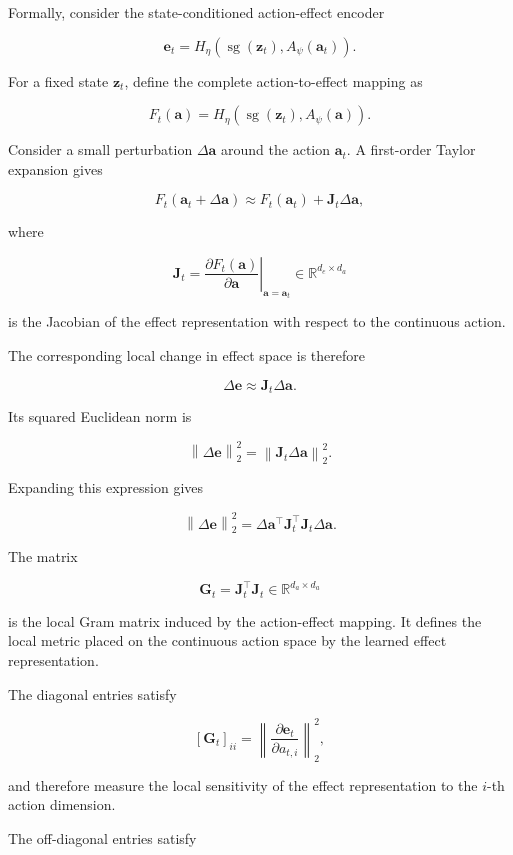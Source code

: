 ﻿\documentclass{article}
\begin{document}
Formally, consider the state-conditioned action-effect encoder

\[
\mathbf{e}_t
=
H_{\eta}
\left(
\operatorname{sg}(\mathbf{z}_t),
A_{\psi}(\mathbf{a}_t)
\right).
\]

For a fixed state \(\mathbf{z}_t\), define the complete action-to-effect
mapping as

\[
F_t(\mathbf{a})
=
H_{\eta}
\left(
\operatorname{sg}(\mathbf{z}_t),
A_{\psi}(\mathbf{a})
\right).
\]

Consider a small perturbation
\(\Delta \mathbf{a}\) around the action \(\mathbf{a}_t\). A first-order
Taylor expansion gives

\[
F_t(\mathbf{a}_t + \Delta \mathbf{a})
\approx
F_t(\mathbf{a}_t)
+
\mathbf{J}_t \Delta \mathbf{a},
\]

where

\[
\mathbf{J}_t
=
\left.
\frac{\partial F_t(\mathbf{a})}
{\partial \mathbf{a}}
\right|_{\mathbf{a}=\mathbf{a}_t}
\in
\mathbb{R}^{d_e \times d_a}
\]

is the Jacobian of the effect representation with respect to the
continuous action.

The corresponding local change in effect space is therefore

\[
\Delta \mathbf{e}
\approx
\mathbf{J}_t \Delta \mathbf{a}.
\]

Its squared Euclidean norm is

\[
\left\|
\Delta \mathbf{e}
\right\|_2^2
=
\left\|
\mathbf{J}_t \Delta \mathbf{a}
\right\|_2^2.
\]

Expanding this expression gives

\[
\left\|
\Delta \mathbf{e}
\right\|_2^2
=
\Delta \mathbf{a}^{\top}
\mathbf{J}_t^{\top}
\mathbf{J}_t
\Delta \mathbf{a}.
\]

The matrix

\[
\mathbf{G}_t
=
\mathbf{J}_t^{\top}\mathbf{J}_t
\in
\mathbb{R}^{d_a \times d_a}
\]

is the local Gram matrix induced by the action-effect mapping. It defines
the local metric placed on the continuous action space by the learned
effect representation.

The diagonal entries satisfy

\[
[\mathbf{G}_t]_{ii}
=
\left\|
\frac{\partial \mathbf{e}_t}
{\partial a_{t,i}}
\right\|_2^2,
\]

and therefore measure the local sensitivity of the effect representation
to the \(i\)-th action dimension.

The off-diagonal entries satisfy
\end{document}
